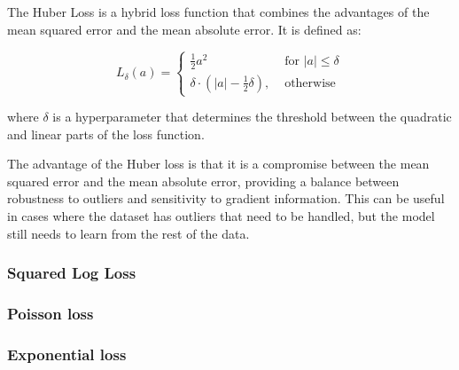 \documentclass{article}
\begin{document}
The Huber Loss is a hybrid loss function that combines the advantages of the mean squared error and the mean absolute error. It is defined as:

\begin{equation}
    L_\delta(a)= \begin{cases}\frac{1}{2} a^2 & \text { for }|a| \leq \delta \\ \delta \cdot\left(|a|-\frac{1}{2} \delta\right), & \text { otherwise }\end{cases}
    \end{equation}

where $\delta$ is a hyperparameter that determines the threshold between the quadratic and linear parts of the loss function.

The advantage of the Huber loss is that it is a compromise between the mean squared error and the mean absolute error, providing a balance between robustness to outliers and sensitivity to gradient information. This can be useful in cases where the dataset has outliers that need to be handled, but the model still needs to learn from the rest of the data.
\subsubsection{Squared Log Loss}
\subsubsection{Poisson loss}
\subsubsection{Exponential loss}
\end{document}
